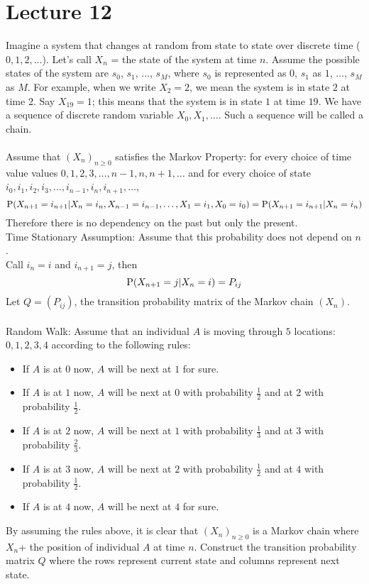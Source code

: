 \documentclass[12pt]{article}
\begin{document}
\section{Lecture 12}
Imagine a system that changes at random from state to state over discrete time ($0,1,2,\dots$). Let's call $X_n$ = the state of the system at time $n$. Assume the possible states of the system are $s_0$, $s_1$, $\dots$, $s_M$, where $s_0$ is represented as $0$, $s_1$ as $1$, $\dots$, $s_M$ as $M$. For example, when we write $X_2 = 2$, we mean the system is in state $2$ at time $2$. Say $X_{19} = 1$; this means that the system is in state $1$ at time $19$. We have a sequence of discrete random variable $X_0,X_1,\dots$. Such a sequence will be called a chain. \\~\\
Assume that $(X_n)_{n\geq 0}$ satisfies the Markov Property: for every choice of time value values $0,1,2,3,\dots,n-1,n,n+1,\dots$ and for every choice of state $i_0,i_1,i_2,i_3,\dots,i_{n-1},i_n,i_{n+1},\dots$, $$ \mathrm{P}( X_{n+1} = i_{n+1} | X_n = i_n, X_{n-1} = i_{n-1},\dots, X_1 = i_1,X_0 = i_0 ) = \mathrm{P}( X_{n+1} = i_{n+1} | X_n = i_n ) $$ 
Therefore there is no dependency on the past but only the present. \\
Time Stationary Assumption: Assume that this probability does not depend on $n$. \\
Call $i_n = i$ and $i_{n+1} = j$, then $$\mathrm{P}( X_{n+1} = j | X_n = i ) = P_{ij} $$ 
Let $Q = (P_{ij})$, the transition probability matrix of the Markov chain $(X_n)$. \\~\\
Random Walk: Assume that an individual $A$ is moving through $5$ locations: $0,1,2,3,4$ according to the following rules: \begin{itemize} 
\item If $A$ is at $0$ now, $A$ will be next at $1$ for sure.
\item If $A$ is at $1$ now, $A$ will be next at $0$ with probability $\frac{1}{2}$ and at $2$ with probability $\frac{1}{2}$. 
\item If $A$ is at $2$ now, $A$ will be next at $1$ with probability $\frac{1}{3}$ and at $3$ with probability $\frac{2}{3}$. 
\item If $A$ is at $3$ now, $A$ will be next at $2$ with probability $\frac{1}{2}$ and at $4$ with probability $\frac{1}{2}$. 
\item If $A$ is at $4$ now, $A$ will be next at $4$ for sure. \end{itemize} 
By assuming the rules above, it is clear that $(X_n)_{n\geq 0}$ is a Markov chain where $X_n$+ the position of individual $A$ at time $n$. Construct the transition probability matrix $Q$ where the rows represent current state and columns represent next state.
\end{document}
